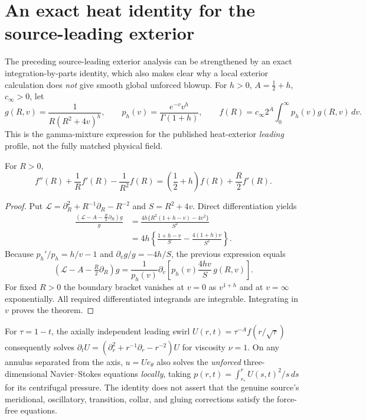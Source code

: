 
\section{An exact heat identity for the source-leading exterior}
\label{sec:source-heat-exterior}
The preceding source-leading exterior analysis can be strengthened by an
exact integration-by-parts identity, which also makes clear why a local
exterior calculation does \emph{not} give smooth global unforced blowup.
For $h>0$, $A=\frac12+h$, $c_\infty>0$, let
\[
g(R,v)=\frac{1}{R(R^2+4v)^h},\qquad
p_h(v)=\frac{e^{-v}v^h}{\Gamma(1+h)},\qquad
f(R)=c_\infty 2^A\int_0^\infty p_h(v)g(R,v)\,dv .
\]
This is the gamma-mixture expression for the published heat-exterior
\emph{leading} profile, not the fully matched physical field.
\begin{theorem}
For $R>0$,
\[
\boxed{f''(R)+\frac{1}{R}f'(R)-\frac{1}{R^2}f(R)
=\left(\frac12+h\right)f(R)+\frac R2 f'(R).}
\]
\end{theorem}
\begin{proof}
Put $\mathcal L=\partial_R^2+R^{-1}\partial_R-R^{-2}$
and $S=R^2+4v$. Direct differentiation yields
\begin{align*}
\frac{(\mathcal L-A-\frac R2\partial_R)g}{g}
&=\frac{4h\{R^2(1+h-v)-4v^2\}}{S^2}\\
&=4h\left\{\frac{1+h-v}{S}
-\frac{4(1+h)v}{S^2}\right\}.
\end{align*}
Because $p_h'/p_h=h/v-1$ and
$\partial_v g/g=-4h/S$, the previous expression equals
\[
(\mathcal L-A-\tfrac R2\partial_R)g
=\frac{1}{p_h(v)}
\partial_v\left[p_h(v)\frac{4hv}{S}\,g(R,v)\right].
\]
For fixed $R>0$ the boundary bracket vanishes at $v=0$
as $v^{1+h}$ and at $v=\infty$ exponentially.
All required differentiated integrands are integrable.
Integrating in $v$ proves the theorem.
\end{proof}
For $\tau=1-t$, the axially independent leading swirl
$U(r,t)=\tau^{-A} f(r/\sqrt{\tau})$ consequently solves
$\partial_tU=(\partial_r^2+r^{-1}\partial_r-r^{-2})U$
for viscosity $\nu=1$. On any annulus separated from the axis,
$u=Ue_\theta$ also solves the \emph{unforced} three-dimensional
Navier--Stokes equations \emph{locally}, taking
$p(r,t)=\int_{r_*}^{r}U(s,t)^2/s\,ds$ for its centrifugal pressure.
The identity does not assert that the genuine source's
meridional, oscillatory, transition, collar, and gluing corrections
satisfy the force-free equations.

